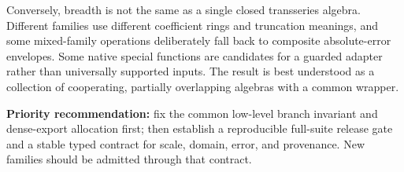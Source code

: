 \documentclass[11pt,letterpaper]{article}
\begin{document}
Conversely, breadth is not the same as a single closed transseries algebra. Different families use different coefficient rings and truncation meanings, and some mixed-family operations deliberately fall back to composite absolute-error envelopes. Some native special functions are candidates for a guarded adapter rather than universally supported inputs. The result is best understood as a collection of cooperating, partially overlapping algebras with a common wrapper.\cite{guide,envelope,native}

\textbf{Priority recommendation:} fix the common low-level branch invariant and dense-export allocation first; then establish a reproducible full-suite release gate and a stable typed contract for scale, domain, error, and provenance. New families should be admitted through that contract.
\end{document}
